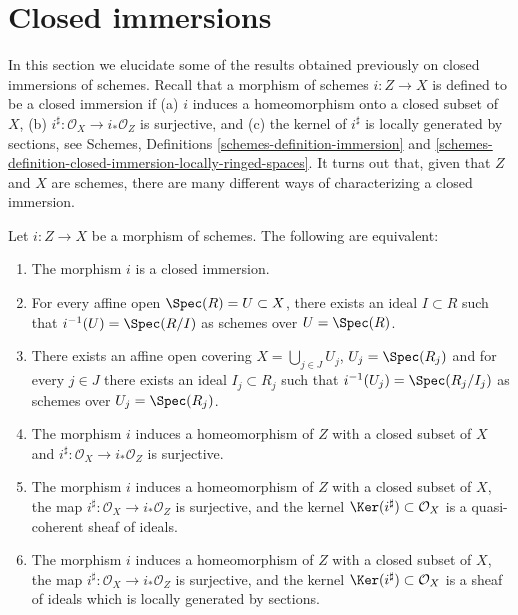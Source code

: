 \section{Closed immersions}
\label{section-closed-immersions}

\noindent
In this section we elucidate some of the results obtained previously on closed
immersions of schemes. Recall that a morphism of schemes $i : Z \to X$
is defined to be a closed immersion if (a) $i$ induces a homeomorphism onto
a closed subset of $X$, (b) $i^\sharp : \mathcal{O}_X \to i_*\mathcal{O}_Z$
is surjective, and (c) the kernel of $i^\sharp$ is locally generated by
sections, see Schemes, Definitions \ref{schemes-definition-immersion}
and \ref{schemes-definition-closed-immersion-locally-ringed-spaces}. It turns
out that, given that $Z$ and $X$ are schemes, there are many different
ways of characterizing a closed immersion.

\begin{lemma}
\label{lemma-closed-immersion}
Let $i : Z \to X$ be a morphism of schemes.
The following are equivalent:
\begin{enumerate}
\item The morphism $i$ is a closed immersion.
\item For every affine open $\Spec(R) = U \subset X$,
there exists an ideal $I \subset R$ such that
$i^{-1}(U) = \Spec(R/I)$ as schemes over $U = \Spec(R)$.
\item There exists an affine open covering $X = \bigcup_{j \in J} U_j$,
$U_j = \Spec(R_j)$ and for every $j \in J$ there exists
an ideal $I_j \subset R_j$ such that
$i^{-1}(U_j) = \Spec(R_j/I_j)$ as schemes over $U_j = \Spec(R_j)$.
\item The morphism $i$ induces a homeomorphism of $Z$ with a closed subset
of $X$ and $i^\sharp : \mathcal{O}_X \to i_*\mathcal{O}_Z$ is surjective.
\item The morphism $i$ induces a homeomorphism of $Z$ with a closed subset
of $X$, the map $i^\sharp : \mathcal{O}_X \to i_*\mathcal{O}_Z$ is surjective,
and the kernel $\Ker(i^\sharp)\subset \mathcal{O}_X$ is a quasi-coherent
sheaf of ideals.
\item The morphism $i$ induces a homeomorphism of $Z$ with a closed subset
of $X$, the map $i^\sharp : \mathcal{O}_X \to i_*\mathcal{O}_Z$ is surjective,
and the kernel $\Ker(i^\sharp)\subset \mathcal{O}_X$ is a
sheaf of ideals which is locally generated by sections.
\end{enumerate}
\end{lemma}

